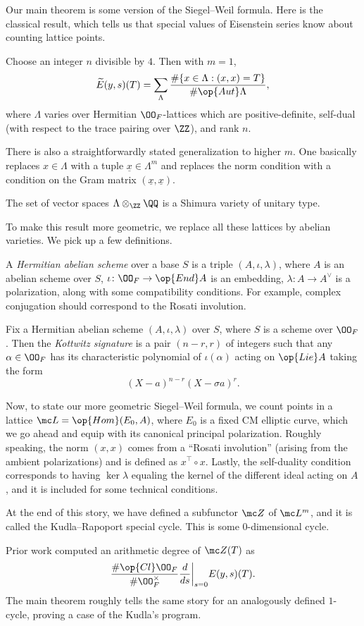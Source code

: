 \documentclass{article}
\begin{document}
Our main theorem is some version of the Siegel--Weil formula. Here is the classical result, which tells us that special values of Eisenstein series know about counting lattice points.
\begin{theorem}
	Choose an integer $n$ divisible by $4$. Then with $m=1$,
	\[\widetilde E(y,s)(T)=\sum_{\Lambda}\frac{\#\{x\in\Lambda:(x,x)=T\}}{\#\op{Aut}\Lambda},\]
	where $\Lambda$ varies over Hermitian $\OO_F$-lattices which are positive-definite, self-dual (with respect to the trace pairing over $\ZZ$), and rank $n$.
\end{theorem}
\begin{remark}
	There is also a straightforwardly stated generalization to higher $m$. One basically replaces $x\in\Lambda$ with a tuple $\underline x\in\Lambda^m$ and replaces the norm condition with a condition on the Gram matrix $(\underline x,\underline x)$.
\end{remark}
\begin{remark}
	The set of vector spaces $\Lambda\otimes_\ZZ\QQ$ is a Shimura variety of unitary type.
\end{remark}
To make this result more geometric, we replace all these lattices by abelian varieties. We pick up a few definitions.
\begin{definition}
	A \textit{Hermitian abelian scheme} over a base $S$ is a triple $(A,\iota,\lambda)$, where $A$ is an abelian scheme over $S$, $\iota\colon\OO_F\to\op{End}A$ is an embedding, $\lambda\colon A\to A^\lor$ is a polarization, along with some compatibility conditions. For example, complex conjugation should correspond to the Rosati involution.
\end{definition}
\begin{definition}
	Fix a Hermitian abelian scheme $(A,\iota,\lambda)$ over $S$, where $S$ is a scheme over $\OO_F$. Then the \textit{Kottwitz signature} is a pair $(n-r,r)$ of integers such that any $\alpha\in\OO_F$ has its characteristic polynomial of $\iota(\alpha)$ acting on $\op{Lie}A$ taking the form
	\[(X-a)^{n-r}(X-\sigma a)^r.\]
\end{definition}
Now, to state our more geometric Siegel--Weil formula, we count points in a lattice $\mc L=\op{Hom}(E_0,A)$, where $E_0$ is a fixed CM elliptic curve, which we go ahead and equip with its canonical principal polarization. Roughly speaking, the norm $(x,x)$ comes from a ``Rosati involution'' (arising from the ambient polarizations) and is defined as $x^\intercal\circ x$. Lastly, the self-duality condition corresponds to having $\ker\lambda$ equaling the kernel of the different ideal acting on $A$, and it is included for some technical conditions.

At the end of this story, we have defined a subfunctor $\mc Z$ of $\mc L^m$, and it is called the Kudla--Rapoport special cycle. This is some $0$-dimensional cycle.
\begin{remark}
	Prior work computed an arithmetic degree of $\mc Z(T)$ as
	\[\frac{\#\op{Cl}\OO_F}{\#\OO_F^\times}\frac d{ds}\bigg|_{s=0}E(y,s)(T).\]
	The main theorem roughly tells the same story for an analogously defined $1$-cycle, proving a case of the Kudla's program.
\end{remark}
\end{document}

